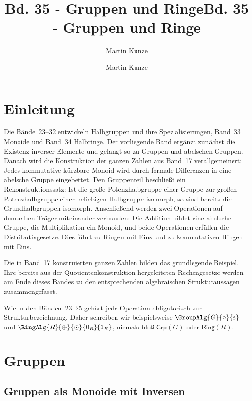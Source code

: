 \documentclass[main.tex]{subfiles}
\title{Bd. 35 - Gruppen und Ringe}
\author{Martin Kunze}
\date{}
\begin{document}
\newcommand{\BandXXIXProofRefStack}[1]{%
  \ensuremath{\begin{gathered}#1\end{gathered}}}

\title{Bd. 35 - Gruppen und Ringe}
\author{Martin Kunze}
\date{}
\hypersetup{pageanchor=false}
\maketitle
\hypersetup{pageanchor=true}
\setcounter{tocdepth}{3}
\tableofcontents
\setcounter{file}{35}
\renewcommand{\FormulaBandID}{35}

\chapter{Einleitung}

Die Bände~23--32 entwickeln Halbgruppen und ihre Spezialisierungen,
Band~33 Monoide und Band~34 Halbringe.
Der vorliegende Band ergänzt zunächst die Existenz inverser Elemente und
gelangt so zu Gruppen und abelschen Gruppen. Danach wird die Konstruktion
der ganzen Zahlen aus Band~17 verallgemeinert: Jedes kommutative kürzbare
Monoid wird durch formale Differenzen in eine abelsche Gruppe eingebettet.
Den Gruppenteil beschließt ein Rekonstruktionssatz: Ist die große
Potenzhalbgruppe einer Gruppe zur großen Potenzhalbgruppe einer beliebigen
Halbgruppe isomorph, so sind bereits die Grundhalbgruppen isomorph.
Anschließend werden zwei Operationen auf demselben Träger miteinander
verbunden: Die Addition bildet eine abelsche Gruppe, die Multiplikation ein
Monoid, und beide Operationen erfüllen die Distributivgesetze. Dies führt zu
Ringen mit Eins und zu kommutativen Ringen mit Eins.

Die in Band~17 konstruierten ganzen Zahlen bilden das grundlegende Beispiel.
Ihre bereits aus der Quotientenkonstruktion hergeleiteten Rechengesetze
werden am Ende dieses Bandes zu den entsprechenden algebraischen
Strukturaussagen zusammengefasst.

Wie in den Bänden~23--25 gehört jede Operation obligatorisch zur
Strukturbezeichnung. Daher schreiben wir beispielsweise
\(\GroupAlg{G}{\circ}{e}\) und
\(\RingAlg{R}{\oplus}{\odot}{0_R}{1_R}\), niemals bloß
\(\mathsf{Grp}(G)\) oder \(\mathsf{Ring}(R)\).

\chapter{Gruppen}

\section{Gruppen als Monoide mit Inversen}
\end{document}
